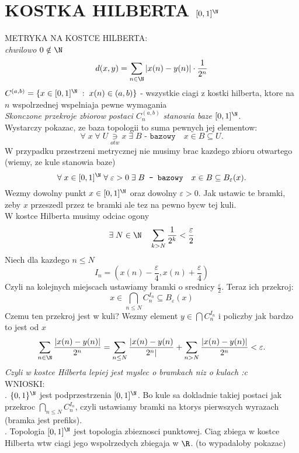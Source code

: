 \documentclass{article}
\begin{document}
\ttfamily
\section*{KOSTKA HILBERTA $[0,1]^\N$}
{\large\color{def}METRYKA NA KOSTCE HILBERTA:}\smallskip\\
\emph{chwilowo $0\notin\N$}
{\color{emp}\large$$d(x,y)=\sum\limits_{n\in\N}|x(n)-y(n)|\cdot\frac1{2^n}$$}
$C^{(a,b)}=\{x\in[0,1]^\N\;:\;x(n)\in(a,b)\}$ - wszystkie ciagi z kostki hilberta, ktore na $n$ wspolrzednej wspelniaja pewne wymagania\bigskip\\
\emph{\color{acc}Skonczone przekroje zbiorow postaci $C^{(a,b)}_n$ stanowia baze $[0,1]^\N$}.\medskip\\
\dowod
Wystarczy pokazac, ze baza topologii to suma pewnych jej elementow:
$$\forall\;x\;\forall\;U\underset{otw}\ni x\;\exists\;B\texttt{ - bazowy}\quad x\in B\subseteq U.$$
W przypadku {\color{acc}przestrzeni metrycznej} nie musimy brac kazdego zbioru otwartego (wiemy, ze kule stanowia baze)
$$\forall\;x\in[0,1]^\N\;\forall\;\varepsilon>0\;\exists\;B\texttt{ - bazowy}\quad x\in B\subseteq B_\varepsilon(x).$$
Wezmy dowolny punkt $x\in[0,1]^\N$ oraz dowolny $\varepsilon>0$. Jak ustawic te bramki, zeby $x$ przeszedl przez te bramki ale tez na pewno bycw tej kuli.\smallskip\\
W kostce Hilberta musimy odciac ogony
$$\exists\;N\in\N\quad \sum\limits_{k>N}\frac1{2^k}<\frac\varepsilon2$$
Niech dla kazdego $n\leq N$
$$I_n=(x(n)-\frac\varepsilon4, x(n)+\frac\varepsilon4)$$
Czyli na kolejnych miejscach ustawiamy bramki o srednicy $\frac\varepsilon2$. Teraz ich przekroj:
$$x\in\bigcap\limits_{n\leq N}C^{I_n}_n\subseteq B_\varepsilon(x)$$
Czemu ten przekroj jest w kuli? Wezmy element $y\in\bigcap C^{I_n}_n$ i policzby jak bardzo to jest od $x$
$$\sum\limits_{n\in\N}{|x(n)-y(n)|\over 2^n}=\sum\limits_{n\leq N}{|x(n)-y(n)\over 2^n|}+\sum\limits_{n>N}{|x(n)-y(n)|\over2^n}<\varepsilon.$$
\emph{Czyli w kostce Hilberta lepiej jest myslec o bramkach niz o kulach :c}
\kondow
{}\bigskip\\
{\large\color{tit}WNIOSKI:}\medskip\\
. $\{0,1\}^\N$ jest podprzestrzenia $[0,1]^\N$. Bo kule sa dokladnie takiej postaci jak przekroc $\bigcap\limits_{n\leq N}C^{I_n}_n$, czyli ustawiamy bramki na ktorys pierwszych wyrazach (bramka jest prefiks).\smallskip\\
. Topologia $[0,1]^\N$ jest topologia {\color{emp}zbieznosci punktowej}. Ciag zbiega w kostce Hilberta wtw ciagi jego wspolrzedych zbiegaja w $\R$. (to wypadaloby pokazac)\bigskip\\
\end{document}
